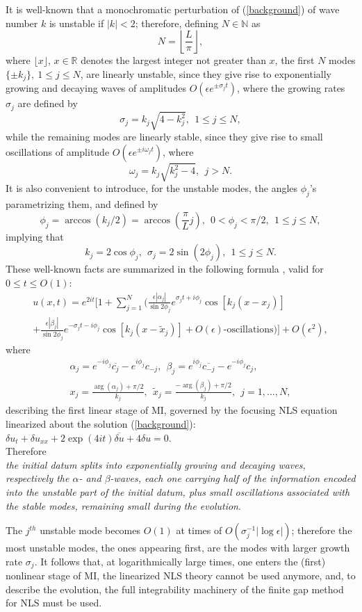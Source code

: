 \documentclass[12pt]{article}
\newcommand{\RR}{\mathbb R}
\newcommand{\NN}{{\mathbb N}}
\newcommand{\beq}{\begin{equation}}
\newcommand{\eeq}{\end{equation}}
\newcommand{\ba}{\begin{array}}
\newcommand{\ea}{\end{array}}
\newcommand{\eps}{{\epsilon}}
\begin{document}
It is well-known that a monochromatic perturbation of (\ref{background}) of wave number $k$ is unstable if $|k|<2$; therefore, defining $N\in\NN$ as
\beq\label{def_N}
N=\left\lfloor \frac{L}{\pi}\right\rfloor ,
\eeq
where $\lfloor x \rfloor$,  $x\in\RR$  denotes the largest integer not greater than $x$, 
the first $N$ modes $\{\pm k_j\},~1\le j \le N$, are linearly unstable, since they give rise to exponentially growing and decaying waves of amplitudes $O(\eps e^{\pm \sigma_j t})$, where the growing rates $\sigma_j$ are defined by
\beq\label{def_ampl}
\sigma_j=k_j\sqrt{4-k^2_j}, \ \ 1\le j \le N,
\eeq 
while the remaining modes are linearly stable, since they give rise to small oscillations of amplitude $O(\eps e^{\pm i \omega_j t})$, where 
\beq
\omega_j=k_j\sqrt{k^2_j -4}, \ \ j>N. 
\eeq
It is also convenient to introduce, for the unstable modes, the angles $\phi_j$'s parametrizing them, and defined by
\beq\label{def_angle0}
\phi_j=\arccos(k_j/2)=\arccos\left(\frac{\pi}{L}j\right), \ \ 0<\phi_j<\pi/2 , \ \ 1\le j \le N,
\eeq
implying that
\beq
k_j=2\cos\phi_j, \ \ \sigma_j=2\sin(2\phi_j),  \ \ 1\le j \le N.
\eeq
These well-known facts are summarized in the following formula \cite{GS1,GS2}, valid for $0\le t\le O(1)$:
\beq\label{linear_stage}
\ba{l}
u(x,t)=e^{2it}\Big[1+\sum\limits_{j=1}^N\Big(\frac{\epsilon|\alpha_j |}{\sin 2\phi_j}e^{\sigma_j t+i\phi_j}\cos[k_j (x-x_j)]\\
+ \frac{\epsilon|\beta_j |}{\sin 2\phi_j}e^{-\sigma_j t-i\phi_j}\cos[k_j (x-\tilde{x}_j)]+O(\eps)\mbox{-oscillations} \Big)\Big] +O(\eps^2) ,
\ea
\eeq
where
\beq\label{def_alpha_beta_0}
\ba{l}
\alpha_j=e^{-i\phi_j}\overline{c_j}-e^{i\phi_j}c_{-j}, \ \ \beta_j=e^{i\phi_j}\overline{c_{-j}}-e^{-i\phi_j}c_j, \\
x_j=\frac{\arg(\alpha_j)+\pi/2}{k_j}, \ \ \tilde{x}_j=\frac{-\arg(\beta_j)+\pi/2}{k_j}, \ \ j=1,\dots,N ,
\ea
\eeq
describing the first linear stage of MI, governed by the focusing NLS equation linearized about the solution (\ref{background}): $\delta u_t +\delta u_{xx}+2\exp(4it)\overline{\delta u}+4\delta u=0$.\\
Therefore \\
{\it the initial datum splits into exponentially growing and decaying waves, respectively the $\alpha$- and $\beta$-waves, each one carrying half of the information encoded into the unstable part of the initial datum, plus small oscillations associated with the stable modes, remaining small during the evolution}.

The $j^{th}$ unstable mode becomes $O(1)$ at times of $O(\sigma_j^{-1}|\log\eps|)$; therefore the most unstable modes, the ones appearing first, are the modes with larger growth rate $\sigma_j$. It follows that, at logarithmically large times, one enters the (first) nonlinear stage of MI, the linearized NLS theory cannot be used anymore, and, to describe the evolution, the full integrability machinery of the finite gap method for NLS must be used. 
\end{document}
